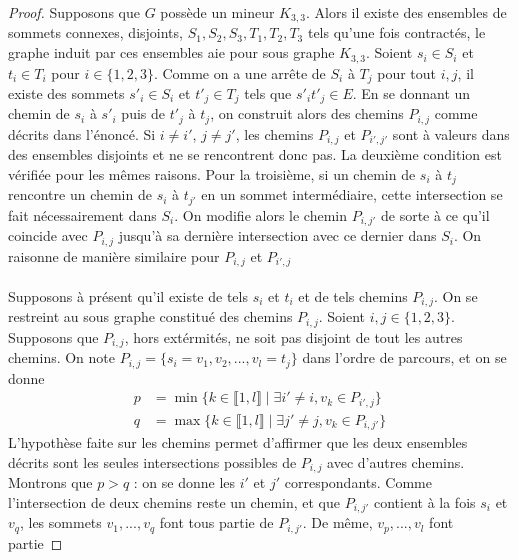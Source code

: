 \documentclass{scrartcl}
\begin{document}
\begin{flushleft}
\begin{proof}
    Supposons que $G$ possède un mineur $K_{3,3}$. Alors il existe des ensembles de sommets connexes, disjoints, $S_1, S_2, S_3, T_1, T_2, T_3$
    tels qu'une fois contractés, le graphe induit par ces ensembles aie pour sous graphe $K_{3,3}$. Soient $s_i \in S_i$ et $t_i \in T_i$
    pour $i \in \{1, 2, 3\}$. Comme on a une arrête de $S_i$ à $T_j$ pour tout $i,j$, il existe des sommets $s'_i \in S_i$ et $t'_j \in T_j$
    tels que $s'_i t'_j \in E$. En se donnant un chemin de $s_i$ à $s'_i$ puis de $t'_j$ à $t_j$, on construit alors des chemins
    $P_{i,j}$ comme décrits dans l'énoncé. Si $i \neq i'$, $j \neq j'$, les chemins $P_{i,j}$ et $P_{i',j'}$ sont à valeurs dans des
    ensembles disjoints et ne se rencontrent donc pas. La deuxième condition est vérifiée pour les mêmes raisons. Pour la troisième,
    si un chemin de $s_i$ à $t_j$ rencontre un chemin de $s_i$ à $t_{j'}$ en un sommet intermédiaire, cette intersection se fait nécessairement
    dans $S_i$. On modifie alors le chemin $P_{i,j'}$ de sorte à ce qu'il coincide avec $P_{i,j}$ jusqu'à sa dernière intersection avec ce dernier
    dans $S_i$. On raisonne de manière similaire pour $P_{i,j}$ et $P_{i',j}$
    \\~\\
    Supposons à présent qu'il existe de tels $s_i$ et $t_i$ et de tels chemins $P_{i,j}$. On se restreint au sous graphe constitué des
    chemins $P_{i,j}$. Soient $i,j \in \{1,2,3\}$.
    Supposons que $P_{i,j}$, hors extérmités, ne soit pas disjoint de tout les autres chemins. On note
    $P_{i,j} = \{s_i = v_1, v_2, ..., v_l = t_j\}$ dans l'ordre de parcours, et on se donne
    \begin{equation*}
    \begin{split}
        p &= \min \{ k \in \llbracket 1, l \rrbracket \mid \exists i' \neq i, v_k \in P_{i',j}\}\\
        q &= \max \{ k \in \llbracket 1, l \rrbracket \mid \exists j' \neq j, v_k \in P_{i, j'} \}
    \end{split}
    \end{equation*}
    L'hypothèse faite sur les chemins permet d'affirmer que les deux ensembles décrits sont les seules intersections possibles de $P_{i,j}$
    avec d'autres chemins.\\
    Montrons que $p > q$ : on se donne les $i'$ et $j'$ correspondants. Comme l'intersection de deux chemins reste un chemin, et que $P_{i,j'}$
    contient à la fois $s_i$ et $v_q$, les sommets $v_1, ..., v_q$ font tous partie de $P_{i,j'}$. De même, $v_p, ..., v_l$ font partie

\end{proof}
\end{flushleft}
\end{document}
